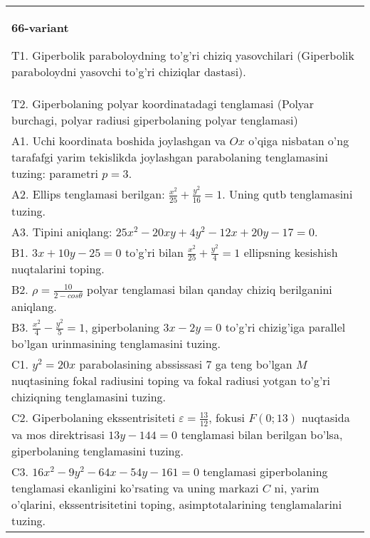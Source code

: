 \documentclass{article}
\begin{document}
\begin{tabular}{m{17cm}}
\textbf{66-variant}
\newline

T1. Giperbolik paraboloydning to'g'ri chiziq yasovchilari (Giperbolik paraboloydni yasovchi to'g'ri chiziqlar dastasi).\\

T2. Giperbolaning polyar koordinatadagi tenglamasi (Polyar burchagi, polyar radiusi giperbolaning polyar tenglamasi)\\

A1. Uchi koordinata boshida joylashgan va $Ox$ o'qiga nisbatan o'ng tarafafgi yarim tekislikda joylashgan parabolaning tenglamasini tuzing: parametri $p=3$.\\

A2. Ellips tenglamasi berilgan: $\frac{x^2}{25}+\frac{y^2}{16}=1$. Uning qutb tenglamasini tuzing.\\

A3. Tipini aniqlang: $25x^{2}-20xy+4y^{2}-12x+20y-17=0$.\\

B1. $3x + 10y - 25 = 0$ to'g'ri bilan $\frac{x^{2}}{25} + \frac{y^{2}}{4} = 1$ ellipsning kesishish nuqtalarini toping.  \\

B2. $\rho = \frac{10}{2 - cos\theta}$ polyar tenglamasi bilan qanday chiziq berilganini aniqlang.  \\

B3. $\frac{x^{2}}{4} - \frac{y^{2}}{5} = 1$, giperbolaning $3x - 2y = 0$ to'g'ri chizig'iga parallel bo'lgan urinmasining tenglamasini tuzing.  \\

C1. $y^{2} = 20x$ parabolasining abssissasi 7 ga teng bo'lgan $M$ nuqtasining fokal radiusini toping va fokal radiusi yotgan to'g'ri chiziqning tenglamasini tuzing.  \\

C2. Giperbolaning ekssentrisiteti $\varepsilon = \frac{13}{12}$, fokusi $F(0;13)$ nuqtasida va mos direktrisasi $13y - 144 = 0$ tenglamasi bilan berilgan bo'lsa, giperbolaning tenglamasini tuzing.  \\

C3. $16x^{2} - 9y^{2} - 64x - 54y - 161 = 0$ tenglamasi giperbolaning tenglamasi ekanligini ko'rsating va uning markazi $C$ ni, yarim o'qlarini, ekssentrisitetini toping, asimptotalarining tenglamalarini tuzing.  \\

\end{tabular}
\vspace{1cm}
\end{document}
